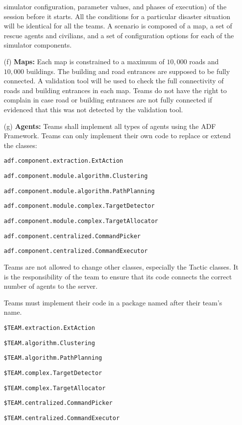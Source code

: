 \documentclass{article}
\begin{document}
\begin{itemize}
simulator configuration, parameter values, and phases of execution) of the
session before it starts. All the conditions for a particular disaster situation
will be identical for all the teams. A scenario is composed of a map, a set of
rescue agents and civilians, and a set of configuration options for each of the
simulator components.
\item[(f)] \textbf{Maps:} Each map is constrained to a maximum of $10,000$ roads
and $10,000$ buildings. The building and road entrances are supposed to be fully
connected. A validation tool will be used to check the full connectivity of
roads and building entrances in each map. Teams do not have the right to
complain in case road or building entrances are not fully connected if evidenced
that this was not detected by the validation tool.
\item[(g)] \textbf{Agents:} Teams shall implement all types of agents using the 
ADF Framework. Teams can only implement their own code to replace or extend the classes:

\footnotesize
\texttt{adf.component.extraction.ExtAction}

\texttt{adf.component.module.algorithm.Clustering}

\texttt{adf.component.module.algorithm.PathPlanning}

\texttt{adf.component.module.complex.TargetDetector}

\texttt{adf.component.module.complex.TargetAllocator}

\texttt{adf.component.centralized.CommandPicker}

\texttt{adf.component.centralized.CommandExecutor}

\normalsize
Teams are not allowed to change other classes, especially the Tactic classes. 
It is the responsibility of the team to ensure that its code connects the
correct number of agents to the server.

Teams must implement their code in a package named after their team's name.

\small
\texttt{\$TEAM.extraction.ExtAction}

\texttt{\$TEAM.algorithm.Clustering}

\texttt{\$TEAM.algorithm.PathPlanning}

\texttt{\$TEAM.complex.TargetDetector}

\texttt{\$TEAM.complex.TargetAllocator}

\texttt{\$TEAM.centralized.CommandPicker}

\texttt{\$TEAM.centralized.CommandExecutor}


\end{itemize}
\end{document}
